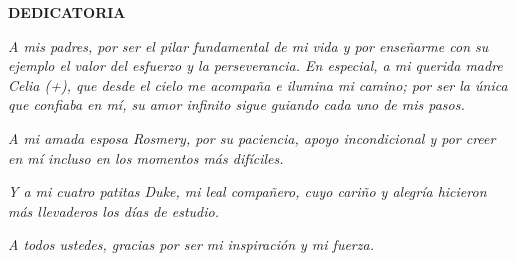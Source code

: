 \thispagestyle{plain}

\vspace*{4cm} %

\begin{flushright}
	{\bfseries\fontsize{13pt}{16pt}\selectfont DEDICATORIA}
\end{flushright}


\begin{flushright}
	\textit{A mis padres, por ser el pilar fundamental de mi vida y por enseñarme con su ejemplo el valor del esfuerzo y la perseverancia. En especial, a mi querida madre Celia (+), que desde el cielo me acompaña e ilumina mi camino; por ser la única que confiaba en mí, su amor infinito sigue guiando cada uno de mis pasos.}
	
	\vspace{0.2cm}
	
	\textit{A mi amada esposa Rosmery, por su paciencia, apoyo incondicional y por creer en mí incluso en los momentos más difíciles.}
	
	\vspace{0.2cm}
	
	\textit{Y a mi cuatro patitas Duke, mi leal compañero, cuyo cariño y alegría hicieron más llevaderos los días de estudio.}
	
	\vspace{0.2cm}
	
	\textit{A todos ustedes, gracias por ser mi inspiración y mi fuerza.}
\end{flushright}